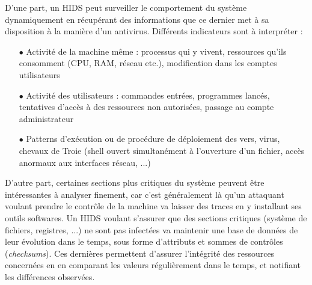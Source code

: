 \documentclass[]{article}
\begin{document}
\par D'une part, un HIDS peut surveiller le comportement du système  dynamiquement en récupérant des informations que ce dernier met à sa disposition à la manière d'un antivirus. Différents indicateurs sont à interpréter :
\vspace{0.2cm}
\begin{itemize}
\item[$\bullet$] Activité de la machine même : processus qui y vivent, ressources qu'ils consomment (CPU, RAM, réseau etc.), modification dans les comptes utilisateurs
\vspace{0.2cm}
\item[$\bullet$] Activité des utilisateurs : commandes entrées, programmes lancés, tentatives d'accès à des ressources non autorisées, passage au compte administrateur
\vspace{0.2cm}
\item[$\bullet$] Patterns d'exécution ou de procédure de déploiement des vers, virus, chevaux de Troie (shell ouvert simultanément à l'ouverture d'un fichier, accès anormaux aux interfaces réseau, ...)
\end{itemize}
\vspace{0.4cm}
\par D'autre part, certaines sections plus critiques du système peuvent être intéressantes à analyser finement, car c'est généralement là qu'un attaquant voulant prendre le contrôle de la machine va laisser des traces en y installant ses outils softwares. Un HIDS voulant s'assurer que des sections critiques (système de fichiers, registres, ...) ne sont pas infectées va maintenir une base de données de leur évolution dans le temps, sous forme d'attributs et sommes de contrôles (\textit{checksums}). Ces dernières permettent d'assurer l'intégrité des ressources concernées en en comparant les valeurs régulièrement dans le temps, et notifiant les différences observées.
\end{document}
